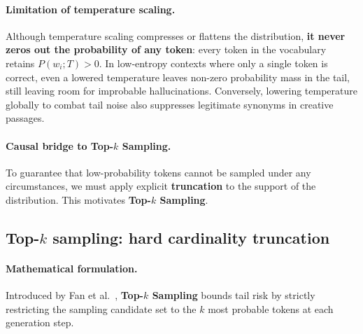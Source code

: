 \documentclass[../../main.tex]{subfiles}
\begin{document}
\paragraph{Limitation of temperature scaling.}
Although temperature scaling compresses or flattens the distribution, \textbf{it never zeros out the probability of any token}: every token in the vocabulary retains $P(w_i; T) > 0$. In low-entropy contexts where only a single token is correct, even a lowered temperature leaves non-zero probability mass in the tail, still leaving room for improbable hallucinations. Conversely, lowering temperature globally to combat tail noise also suppresses legitimate synonyms in creative passages.

\paragraph{Causal bridge to Top-$k$ Sampling.}
To guarantee that low-probability tokens cannot be sampled under any circumstances, we must apply explicit \textbf{truncation} to the support of the distribution. This motivates \textbf{Top-$k$ Sampling}.

\subsection{Top-$k$ sampling: hard cardinality truncation}
\label{subsec:top_k_sampling}

\paragraph{Mathematical formulation.}
Introduced by Fan et al.~\cite{fan2018}, \textbf{Top-$k$ Sampling} bounds tail risk by strictly restricting the sampling candidate set to the $k$ most probable tokens at each generation step.
\end{document}

